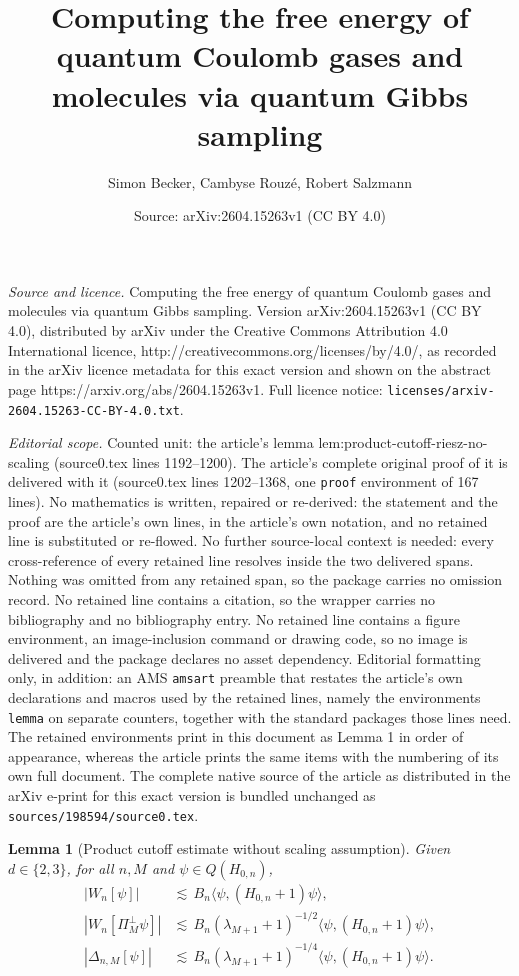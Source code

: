 \documentclass[10pt,a4paper]{amsart}
\title{Computing the free energy of quantum Coulomb gases and molecules via quantum Gibbs sampling}
\author{Simon Becker, Cambyse Rouz\'e, Robert Salzmann}
\date{Source: arXiv:2604.15263v1 (CC BY 4.0)}
\newtheorem{lemma}{Lemma}
\begin{document}
\maketitle

\noindent\emph{Source and licence.} Computing the free energy of quantum Coulomb gases and molecules via quantum Gibbs sampling. Version arXiv:2604.15263v1 (CC BY 4.0), distributed by arXiv under the Creative Commons Attribution 4.0 International licence, http://creativecommons.org/licenses/by/4.0/, as recorded in the arXiv licence metadata for this exact version and shown on the abstract page https://arxiv.org/abs/2604.15263v1. Full licence notice: \texttt{licenses/arxiv-2604.15263-CC-BY-4.0.txt}.\par\smallskip

\noindent\textit{Editorial scope.} Counted unit: the article's lemma lem:product-cutoff-riesz-no-scaling (source0.tex lines 1192--1200). The article's complete original proof of it is delivered with it (source0.tex lines 1202--1368, one \texttt{proof} environment of 167 lines). No mathematics is written, repaired or re-derived: the statement and the proof are the article's own lines, in the article's own notation, and no retained line is substituted or re-flowed.  No further source-local context is needed: every cross-reference of every retained line resolves inside the two delivered spans.  Nothing was omitted from any retained span, so the package carries no omission record.  No retained line contains a citation, so the wrapper carries no bibliography and no bibliography entry.  No retained line contains a figure environment, an image-inclusion command or drawing code, so no image is delivered and the package declares no asset dependency.  Editorial formatting only, in addition: an AMS \texttt{amsart} preamble that restates the article's own declarations and macros used by the retained lines, namely the environments \texttt{lemma} on separate counters, together with the standard packages those lines need.  The retained environments print in this document as Lemma 1 in order of appearance, whereas the article prints the same items with the numbering of its own full document.  The complete native source of the article as distributed in the arXiv e-print for this exact version is bundled unchanged as \texttt{sources/198594/source0.tex}.
\begin{lemma}[Product cutoff estimate without scaling assumption]
\label{lem:product-cutoff-riesz-no-scaling}
Given $d\in\{2,3\}$, for all \(n,M\) and \(\psi\in Q(H_{0,n})\),
\begin{align}
|W_n[\psi]|&\lesssim \,B_n\langle\psi,(H_{0,n}+1)\psi\rangle,\label{eq111}\\
|W_n[\Pi_M^\perp\psi]|&\lesssim\,B_n(\lambda_{M+1}+1)^{-1/2}\langle\psi,(H_{0,n}+1)\psi\rangle,\label{eq222}\\
|\Delta_{n,M}[\psi]|&\lesssim\,B_n(\lambda_{M+1}+1)^{-1/4}\langle\psi,(H_{0,n}+1)\psi\rangle.\label{eq333}
\end{align}
\end{lemma}
\end{document}
